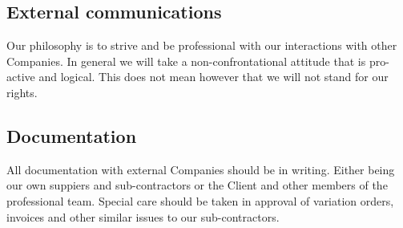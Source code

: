 \subsection*{External communications}

Our philosophy is to strive and be professional with our interactions with other Companies. In general we will take a non-confrontational attitude that is pro-active and logical. This does not mean however that we will not stand for our rights.

\subsection*{Documentation}

All documentation with external Companies should be in writing. Either being our own suppiers and sub-contractors or the Client and other members of the professional team. Special care should be taken in approval of variation orders, invoices and other similar issues to our sub-contractors.
